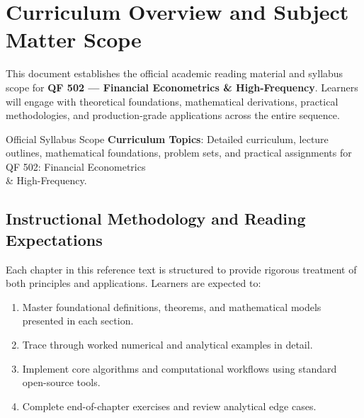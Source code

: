 \section{Curriculum Overview and Subject Matter Scope}

This document establishes the official academic reading material and syllabus scope for \textbf{QF 502 --- Financial Econometrics \& High-Frequency}. Learners will engage with theoretical foundations, mathematical derivations, practical methodologies, and production-grade applications across the entire sequence.

\begin{InsightBox}{Official Syllabus Scope}
  \textbf{Curriculum Topics}: Detailed curriculum, lecture outlines, mathematical foundations, problem sets, and practical assignments for QF 502: Financial Econometrics \\& High-Frequency.
\end{InsightBox}

\subsection{Instructional Methodology and Reading Expectations}

Each chapter in this reference text is structured to provide rigorous treatment of both principles and applications. Learners are expected to:
\begin{enumerate}
  \item Master foundational definitions, theorems, and mathematical models presented in each section.
  \item Trace through worked numerical and analytical examples in detail.
  \item Implement core algorithms and computational workflows using standard open-source tools.
  \item Complete end-of-chapter exercises and review analytical edge cases.
\end{enumerate}

